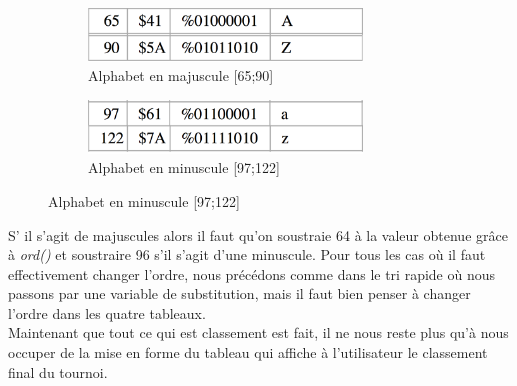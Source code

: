 \documentclass[13pt]{article}
\begin{document}
\begin{figure}[H]
\centering
\begin{subfigure}[H]{.5\textwidth}
  \centering
  \includegraphics[width=0.8\textwidth]{majaz.png}
\caption{Alphabet en majuscule [65;90]}
\end{subfigure}%
\begin{subfigure}[H]{.5\textwidth}
  \centering
  \includegraphics[width=0.8\textwidth]{minaz.png}
\caption{Alphabet en minuscule [97;122]}
\end{subfigure}
\end{figure}
S’ il s'agit de majuscules alors il faut qu'on soustraie 64 à la valeur obtenue grâce à \emph{ord()} et soustraire 96 s'il s'agit d'une minuscule.
Pour tous les cas où il faut effectivement changer l'ordre, nous précédons comme dans le tri rapide où nous passons par une variable de substitution, mais il faut bien penser à changer l'ordre dans les quatre tableaux.\\
Maintenant que tout ce qui est classement est fait, il ne nous reste plus qu'à nous occuper de la mise en forme du tableau qui affiche à l'utilisateur le classement final du tournoi.
\end{document}
